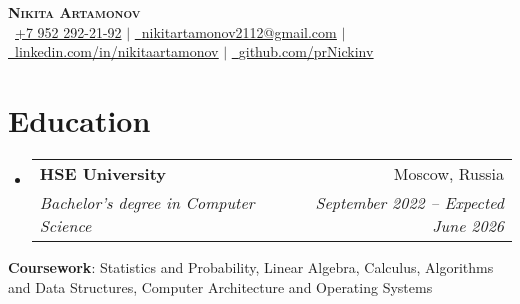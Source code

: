 \documentclass[letterpaper,11pt]{article}
\makeatletter
\newcommand{\resumeSubheading}[4]{
  \vspace{-2pt}\item
    \begin{tabular*}{0.97\textwidth}[t]{l@{\extracolsep{\fill}}r}
      \textbf{#1} & #2 \\
      \textit{\small#3} & \textit{\small #4} \\
    \end{tabular*}\vspace{-7pt}
}
\newcommand{\resumeSubHeadingListStart}{\begin{itemize}[leftmargin=0.15in, label={}]}
\newcommand{\resumeSubHeadingListEnd}{\end{itemize}}
\makeatother
\begin{document}

\begin{center}
    \textbf{\Huge \scshape Nikita Artamonov} \\ \vspace{1pt}
    \small \faMobile\ \underline{+7 952 292-21-92} $|$ \href{mailto:nikitartamonov2112@gmail.com}{\raisebox{-0.2\height}\faEnvelope\ \underline{nikitartamonov2112@gmail.com}} $|$ 
    \href{https://www.linkedin.com/in/nikitaartamonov/}{\raisebox{-0.2\height}\faLinkedin\ \underline{linkedin.com/in/nikitaartamonov}} $|$
    \href{https://github.com/prNickinv}{\raisebox{-0.2\height}\faGithub\ \underline{github.com/prNickinv}}
\end{center}


\section{Education}
  \resumeSubHeadingListStart
    \resumeSubheading
      {HSE University }{Moscow, Russia}
      {Bachelor’s degree in Computer Science}{September 2022 -- Expected June 2026}
  \resumeSubHeadingListEnd

   \begin{itemize}[leftmargin=0.15in, label={}]
    \small{\item{
     \textbf{Coursework}{: Statistics and Probability, Linear Algebra, Calculus, Algorithms and Data Structures, Computer Architecture and Operating Systems} \\
    }}
 \end{itemize}

 
\end{document}
